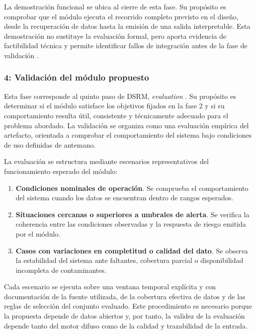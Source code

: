 La demostración funcional se ubica al cierre de esta fase. Su propósito es comprobar que el módulo ejecuta el recorrido completo previsto en el diseño, desde la recuperación de datos hasta la emisión de una salida interpretable. Esta demostración no sustituye la evaluación formal, pero aporta evidencia de factibilidad técnica y permite identificar fallos de integración antes de la fase de validación \cite[p.~85]{METDSR01}.

\subsubsection{4: Validación del módulo propuesto}
Esta fase corresponde al quinto paso de DSRM, \emph{evaluation} \cite[p.~56]{METDSRM01}. Su propósito es determinar si el módulo satisface los objetivos fijados en la fase 2 y si su comportamiento resulta útil, consistente y técnicamente adecuado para el problema abordado. La validación se organiza como una evaluación empírica del artefacto, orientada a comprobar el comportamiento del sistema bajo condiciones de uso definidas de antemano.

La evaluación se estructura mediante escenarios representativos del funcionamiento esperado del módulo:
\begin{enumerate}
\item \textbf{Condiciones nominales de operación}. Se comprueba el comportamiento del sistema cuando los datos se encuentran dentro de rangos esperados.
\item \textbf{Situaciones cercanas o superiores a umbrales de alerta}. Se verifica la coherencia entre las condiciones observadas y la respuesta de riesgo emitida por el módulo.
\item \textbf{Casos con variaciones en completitud o calidad del dato}. Se observa la estabilidad del sistema ante faltantes, cobertura parcial o disponibilidad incompleta de contaminantes.
\end{enumerate}

Cada escenario se ejecuta sobre una ventana temporal explícita y con documentación de la fuente utilizada, de la cobertura efectiva de datos y de las reglas de selección del conjunto evaluado. Este procedimiento es necesario porque la propuesta depende de datos abiertos y, por tanto, la validez de la evaluación depende tanto del motor difuso como de la calidad y trazabilidad de la entrada.

